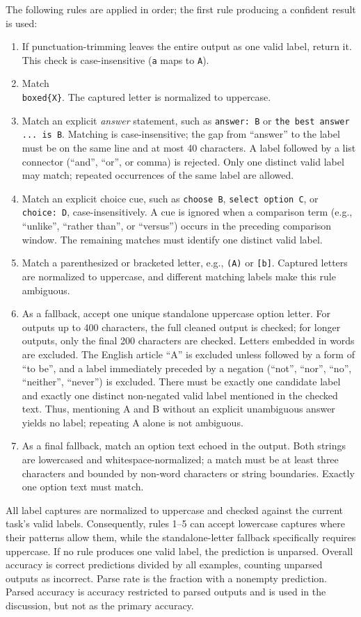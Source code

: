 \documentclass[10pt,twocolumn]{article}
\begin{document}
The following rules are applied in order; the first rule producing a confident result is used:
\begin{enumerate}
\item If punctuation-trimming leaves the entire output as one valid label, return it. This check is case-insensitive (\texttt{a} maps to \texttt{A}).
\item Match \texttt{\\boxed\{X\}}. The captured letter is normalized to uppercase.
\item Match an explicit \emph{answer} statement, such as \texttt{answer: B} or \texttt{the best answer ... is B}. Matching is case-insensitive; the gap from ``answer'' to the label must be on the same line and at most 40 characters. A label followed by a list connector (``and'', ``or'', or comma) is rejected. Only one distinct valid label may match; repeated occurrences of the same label are allowed.
\item Match an explicit choice cue, such as \texttt{choose B}, \texttt{select option C}, or \texttt{choice: D}, case-insensitively. A cue is ignored when a comparison term (e.g., ``unlike'', ``rather than'', or ``versus'') occurs in the preceding comparison window. The remaining matches must identify one distinct valid label.
\item Match a parenthesized or bracketed letter, e.g., \texttt{(A)} or \texttt{[b]}. Captured letters are normalized to uppercase, and different matching labels make this rule ambiguous.
\item As a fallback, accept one unique standalone uppercase option letter. For outputs up to 400 characters, the full cleaned output is checked; for longer outputs, only the final 200 characters are checked. Letters embedded in words are excluded. The English article ``A'' is excluded unless followed by a form of ``to be'', and a label immediately preceded by a negation (``not'', ``nor'', ``no'', ``neither'', ``never'') is excluded. There must be exactly one candidate label and exactly one distinct non-negated valid label mentioned in the checked text. Thus, mentioning A and B without an explicit unambiguous answer yields no label; repeating A alone is not ambiguous.
\item As a final fallback, match an option text echoed in the output. Both strings are lowercased and whitespace-normalized; a match must be at least three characters and bounded by non-word characters or string boundaries. Exactly one option text must match.
\end{enumerate}
All label captures are normalized to uppercase and checked against the current task's valid labels. Consequently, rules 1--5 can accept lowercase captures where their patterns allow them, while the standalone-letter fallback specifically requires uppercase. If no rule produces one valid label, the prediction is unparsed. Overall accuracy is correct predictions divided by all examples, counting unparsed outputs as incorrect. Parse rate is the fraction with a nonempty prediction. Parsed accuracy is accuracy restricted to parsed outputs and is used in the discussion, but not as the primary accuracy.
\end{document}
